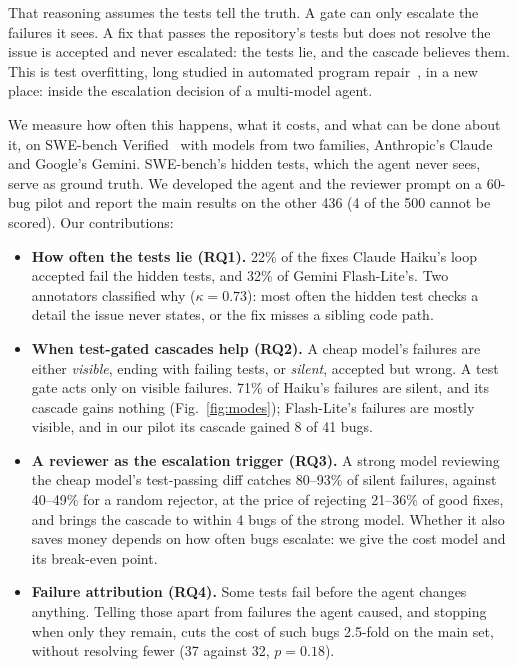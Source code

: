 \documentclass[10pt,conference]{IEEEtran}
\begin{document}
That reasoning assumes the tests tell the truth. A gate can only escalate the failures it sees. A fix that passes the
repository's tests but does not resolve the issue is accepted and never escalated: the tests lie, and the cascade
believes them. This is test overfitting, long studied in automated program repair~\cite{smith2015,qi2015}, in a new
place: inside the escalation decision of a multi-model agent.

We measure how often this happens, what it costs, and what can be done about it, on SWE-bench
Verified~\cite{swebenchverified} with models from two families, Anthropic's Claude and Google's Gemini. SWE-bench's
hidden tests, which the agent never sees, serve as ground truth. We developed the agent and the reviewer prompt on a
60-bug pilot and report the main results on the other 436 (4 of the 500 cannot be scored). Our contributions:
\begin{itemize}
\item \textbf{How often the tests lie (RQ1).} 22\% of the fixes Claude Haiku's loop accepted fail the hidden tests,
and 32\% of Gemini Flash-Lite's. Two annotators classified why ($\kappa=0.73$): most often the hidden test checks a
detail the issue never states, or the fix misses a sibling code path.
\item \textbf{When test-gated cascades help (RQ2).} A cheap model's failures are either \emph{visible}, ending with
failing tests, or \emph{silent}, accepted but wrong. A test gate acts only on visible failures. 71\% of Haiku's
failures are silent, and its cascade gains nothing (Fig.~\ref{fig:modes}); Flash-Lite's failures are mostly visible, and in our pilot its
cascade gained 8 of 41 bugs.
\item \textbf{A reviewer as the escalation trigger (RQ3).} A strong model reviewing the cheap model's test-passing
diff catches 80--93\% of silent failures, against 40--49\% for a random rejector, at the price of rejecting 21--36\%
of good fixes, and brings the cascade to within 4 bugs of the strong model. Whether it also saves money depends on how often bugs escalate: we give the cost model and
its break-even point.
\item \textbf{Failure attribution (RQ4).} Some tests fail before the agent changes anything. Telling those apart from
failures the agent caused, and stopping when only they remain, cuts the cost of such bugs 2.5-fold on the main set,
without resolving fewer (37 against 32, $p=0.18$).
\end{itemize}
\end{document}
